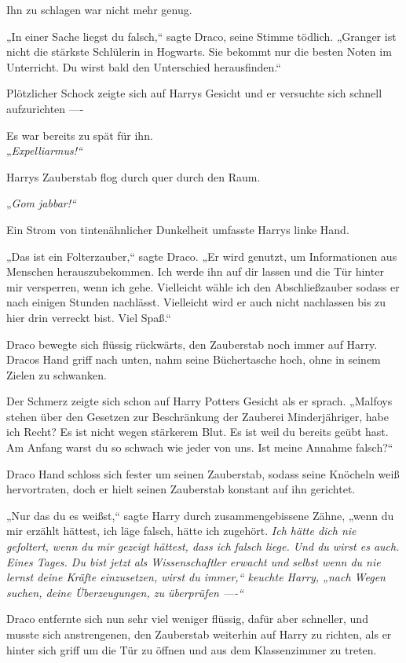 {Ihn zu schlagen war nicht mehr genug.

„In einer Sache liegst du falsch,“ sagte Draco, seine Stimme tödlich. „Granger ist nicht die stärkste Schlülerin in Hogwarts. Sie bekommt nur die besten Noten im Unterricht. Du wirst bald den Unterschied herausfinden.“

Plötzlicher Schock zeigte sich auf Harrys Gesicht und er versuchte sich schnell aufzurichten ----

Es war bereits zu spät für ihn.\\ „\emph{Expelliarmus!“}

Harrys Zauberstab flog durch quer durch den Raum.

„\emph{Gom jabbar!“}

Ein Strom von tintenähnlicher Dunkelheit umfasste Harrys linke Hand.

„Das ist ein Folterzauber,“ sagte Draco. „Er wird genutzt, um Informationen aus Menschen herauszubekommen. Ich werde ihn auf dir lassen und die Tür hinter mir versperren, wenn ich gehe. Vielleicht wähle ich den Abschließzauber sodass er nach einigen Stunden nachlässt. Vielleicht wird er auch nicht nachlassen bis zu hier drin verreckt bist. Viel Spaß.“

Draco bewegte sich flüssig rückwärts, den Zauberstab noch immer auf Harry. Dracos Hand griff nach unten, nahm seine Büchertasche hoch, ohne in seinem Zielen zu schwanken.

Der Schmerz zeigte sich schon auf Harry Potters Gesicht als er sprach. „Malfoys stehen über den Gesetzen zur Beschränkung der Zauberei Minderjähriger, habe ich Recht? Es ist nicht wegen stärkerem Blut. Es ist weil du bereits geübt hast. Am Anfang warst du so schwach wie jeder von uns. Ist meine Annahme falsch?“

Draco Hand schloss sich fester um seinen Zauberstab, sodass seine Knöcheln weiß hervortraten, doch er hielt seinen Zauberstab konstant auf ihn gerichtet.

„Nur das du es weißst,“ sagte Harry durch zusammengebissene Zähne, „wenn du mir erzählt hättest, ich läge falsch, hätte ich zugehört. \emph{Ich hätte dich nie gefoltert, wenn du mir gezeigt hättest, dass ich falsch liege. Und du wirst es auch. Eines Tages. Du bist jetzt als Wissenschaftler erwacht und selbst wenn du nie lernst deine Kräfte einzusetzen, wirst du immer,“ keuchte Harry, „nach Wegen suchen, deine Überzeugungen, zu überprüfen ----“}

Draco entfernte sich nun sehr viel weniger flüssig, dafür aber schneller, und musste sich anstrengenen, den Zauberstab weiterhin auf Harry zu richten, als er hinter sich griff um die Tür zu öffnen und aus dem Klassenzimmer zu treten.

}
